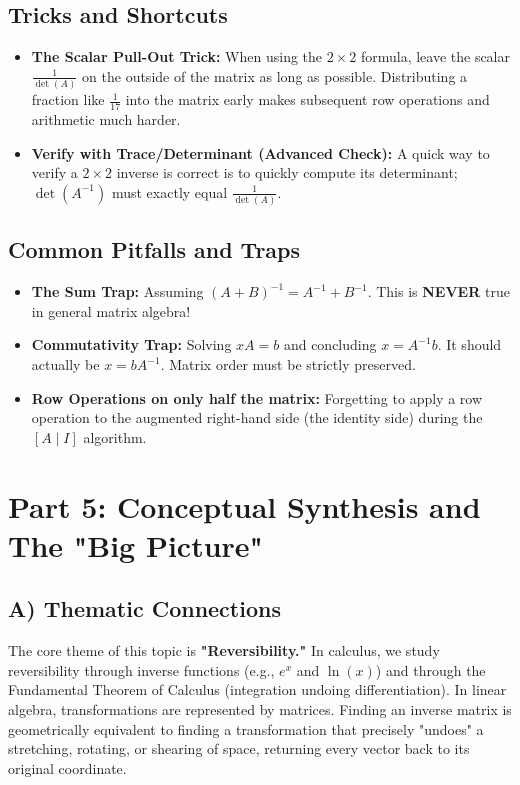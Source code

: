 \documentclass[12pt]{article}
\begin{document}
\subsection{Tricks and Shortcuts}
\begin{itemize}
    \item \textbf{The Scalar Pull-Out Trick:} When using the $2 \times 2$ formula, leave the scalar $\frac{1}{\det(A)}$ on the outside of the matrix as long as possible. Distributing a fraction like $\frac{1}{17}$ into the matrix early makes subsequent row operations and arithmetic much harder.
    \item \textbf{Verify with Trace/Determinant (Advanced Check):} A quick way to verify a $2 \times 2$ inverse is correct is to quickly compute its determinant; $\det(A^{-1})$ must exactly equal $\frac{1}{\det(A)}$.
\end{itemize}

\subsection{Common Pitfalls and Traps}
\begin{itemize}
    \item \textbf{The Sum Trap:} Assuming $(A+B)^{-1} = A^{-1} + B^{-1}$. This is \textbf{NEVER} true in general matrix algebra! 
    \item \textbf{Commutativity Trap:} Solving $xA = b$ and concluding $x = A^{-1}b$. It should actually be $x = b A^{-1}$. Matrix order must be strictly preserved.
    \item \textbf{Row Operations on only half the matrix:} Forgetting to apply a row operation to the augmented right-hand side (the identity side) during the $[A \mid I]$ algorithm.
\end{itemize}

\newpage
\section{Part 5: Conceptual Synthesis and The "Big Picture"}

\subsection{A) Thematic Connections}
The core theme of this topic is \textbf{"Reversibility."} In calculus, we study reversibility through inverse functions (e.g., $e^x$ and $\ln(x)$) and through the Fundamental Theorem of Calculus (integration undoing differentiation). In linear algebra, transformations are represented by matrices. Finding an inverse matrix is geometrically equivalent to finding a transformation that precisely "undoes" a stretching, rotating, or shearing of space, returning every vector back to its original coordinate.
\end{document}
